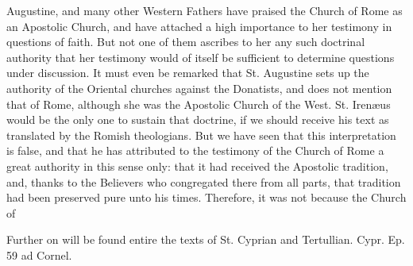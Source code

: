 Augustine, and many other Western Fathers have praised the Church of Rome as an Apostolic Church, and have attached a high importance to her testimony in questions of faith. But not one of them ascribes to her any such doctrinal authority that her testimony would of itself be sufficient to determine questions under discussion. It must even be remarked that St. Augustine sets up the authority of the Oriental churches against the Donatists, and does not mention that of Rome, although she was the Apostolic Church of the West. St. Irenæus would be the only one to sustain that doctrine, if we should receive his text as translated by the Romish theologians. But we have seen that this interpretation is false, and that he has attributed to the testimony of the Church of Rome a great authority in this sense only: that it had received the Apostolic tradition, and, thanks to the Believers who congregated there from all parts, that tradition had been preserved pure unto his times. Therefore, it was not because the Church of

Further on will be found entire the texts of St. Cyprian and Tertullian. Cypr. Ep. 59 ad Cornel.

